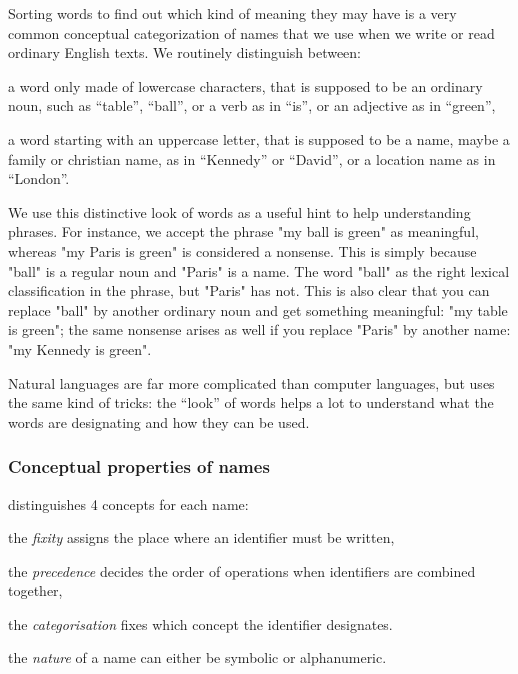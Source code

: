 Sorting words to find out which kind of meaning they may have is a very common
conceptual categorization of names that we use when we write or read ordinary
English texts. We routinely distinguish between:
\begin{citemize}
\item a word only made of lowercase characters, that is supposed to be an
  ordinary noun, such as ``table'', ``ball'', or a verb as in ``is'', or an
  adjective as in ``green'',
\item a word starting with an uppercase letter, that is supposed to be a name,
  maybe a family or christian name, as in ``Kennedy'' or ``David'', or a location
  name as in ``London''.
\end{citemize}

We use this distinctive look of words as a useful hint to help understanding
phrases. For instance, we accept the phrase "my ball is green" as meaningful,
whereas "my Paris is green" is considered a nonsense. This is simply because
"ball" is a regular noun and "Paris" is a name. The word "ball" as the right
lexical classification in the phrase, but "Paris" has not. This is also clear
that you can replace "ball" by another ordinary noun and get something
meaningful: "my table is green"; the same nonsense arises as well if you
replace "Paris" by another name: "my Kennedy is green".

Natural languages are far more complicated than computer languages, but
{\focal} uses the same kind of tricks: the ``look'' of words helps a lot to
understand what the words are designating and how they can be used.

\subsubsection{Conceptual properties of names}

{\focal} distinguishes 4 concepts for each name:

\begin{citemize}
\item the {\em fixity} assigns the place where an identifier must be written,
\item the {\em precedence} decides the order of operations when
  identifiers are combined together,
\item the {\em categorisation} fixes which concept the identifier designates.
\item the {\em nature} of a name can either be symbolic or alphanumeric.
\end{citemize}

